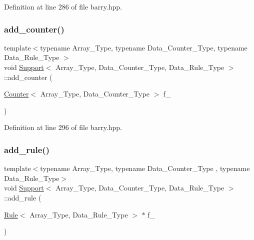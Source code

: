 Definition at line 286 of file barry.\+hpp.

\mbox{\label{classbarry_1_1_support_a00d511970c0bf833ef8bdd7580c670cc}} 
\subsubsection{\texorpdfstring{add\+\_\+counter()}{add\_counter()}\hspace{0.1cm}{\footnotesize\ttfamily [2/2]}}
{\footnotesize\ttfamily template$<$typename Array\+\_\+\+Type, typename Data\+\_\+\+Counter\+\_\+\+Type, typename Data\+\_\+\+Rule\+\_\+\+Type $>$ \\
void \hyperlink{classbarry_1_1_support}{Support}$<$ Array\+\_\+\+Type, Data\+\_\+\+Counter\+\_\+\+Type, Data\+\_\+\+Rule\+\_\+\+Type $>$\+::add\+\_\+counter (\begin{DoxyParamCaption}\item[{\hyperlink{classbarry_1_1_counter}{Counter}$<$ Array\+\_\+\+Type, Data\+\_\+\+Counter\+\_\+\+Type $>$}]{f\+\_\+ }\end{DoxyParamCaption})\hspace{0.3cm}{\ttfamily [inline]}}



Definition at line 296 of file barry.\+hpp.

\mbox{\label{classbarry_1_1_support_a3113a4586c541aa25db7b4a864b748a2}} 
\subsubsection{\texorpdfstring{add\+\_\+rule()}{add\_rule()}\hspace{0.1cm}{\footnotesize\ttfamily [1/2]}}
{\footnotesize\ttfamily template$<$typename Array\+\_\+\+Type, typename Data\+\_\+\+Counter\+\_\+\+Type , typename Data\+\_\+\+Rule\+\_\+\+Type$>$ \\
void \hyperlink{classbarry_1_1_support}{Support}$<$ Array\+\_\+\+Type, Data\+\_\+\+Counter\+\_\+\+Type, Data\+\_\+\+Rule\+\_\+\+Type $>$\+::add\+\_\+rule (\begin{DoxyParamCaption}\item[{\hyperlink{classbarry_1_1_rule}{Rule}$<$ Array\+\_\+\+Type, Data\+\_\+\+Rule\+\_\+\+Type $>$ $\ast$}]{f\+\_\+ }\end{DoxyParamCaption})\hspace{0.3cm}{\ttfamily [inline]}}



